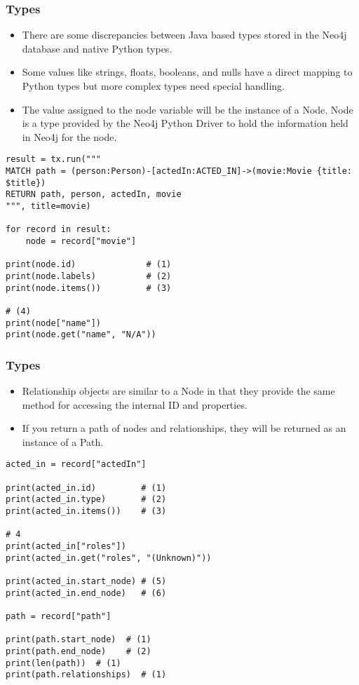 \begin{frame}[fragile]\frametitle{Types}

\begin{itemize}
\item There are some discrepancies between Java based types stored in the Neo4j database and native Python types.
\item Some values like strings, floats, booleans, and nulls have a direct mapping to Python types but more complex types need special handling.
\item The value assigned to the node variable will be the instance of a Node. Node is a type provided by the Neo4j Python Driver to hold the information held in Neo4j for the node.
\end{itemize}

\begin{lstlisting}
result = tx.run("""
MATCH path = (person:Person)-[actedIn:ACTED_IN]->(movie:Movie {title: $title})
RETURN path, person, actedIn, movie
""", title=movie)

for record in result:
    node = record["movie"]
		
print(node.id)              # (1)
print(node.labels)          # (2)
print(node.items())         # (3)

# (4)
print(node["name"])
print(node.get("name", "N/A"))		
\end{lstlisting}

\end{frame}

\begin{frame}[fragile]\frametitle{Types}

\begin{itemize}
\item Relationship objects are similar to a Node in that they provide the same method for accessing the internal ID and properties.
\item If you return a path of nodes and relationships, they will be returned as an instance of a Path.
\end{itemize}

\begin{lstlisting}
acted_in = record["actedIn"]

print(acted_in.id)         # (1)
print(acted_in.type)       # (2)
print(acted_in.items())    # (3)

# 4
print(acted_in["roles"])
print(acted_in.get("roles", "(Unknown)"))

print(acted_in.start_node) # (5)
print(acted_in.end_node)   # (6)

path = record["path"]

print(path.start_node)  # (1)
print(path.end_node)    # (2)
print(len(path))  # (1)
print(path.relationships)  # (1)
\end{lstlisting}

\end{frame}


